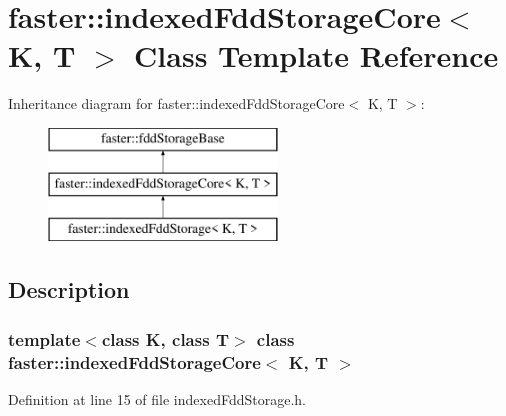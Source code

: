 \hypertarget{classfaster_1_1indexedFddStorageCore}{}\section{faster\+:\+:indexed\+Fdd\+Storage\+Core$<$ K, T $>$ Class Template Reference}
\label{classfaster_1_1indexedFddStorageCore}
Inheritance diagram for faster\+:\+:indexed\+Fdd\+Storage\+Core$<$ K, T $>$\+:\begin{figure}[H]
\begin{center}
\leavevmode
\includegraphics[height=3.000000cm]{classfaster_1_1indexedFddStorageCore}
\end{center}
\end{figure}


\subsection{Description}
\subsubsection*{template$<$class K, class T$>$\newline
class faster\+::indexed\+Fdd\+Storage\+Core$<$ K, T $>$}



Definition at line 15 of file indexed\+Fdd\+Storage.\+h.

